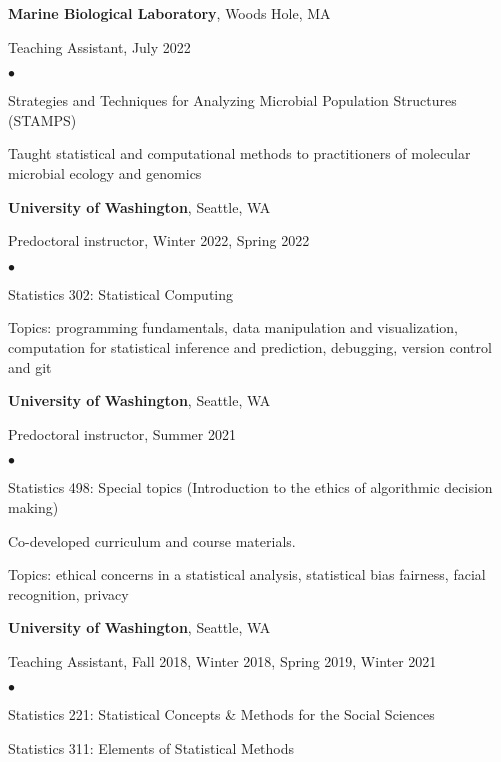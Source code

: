 \documentclass[margin,centered]{res}
\newenvironment{list1}{
  \begin{list}{\ding{113}}{%
      \setlength{\itemsep}{0in}
      \setlength{\parsep}{0in} \setlength{\parskip}{0in}
      \setlength{\topsep}{0in} \setlength{\partopsep}{0in}
      \setlength{\leftmargin}{0.17in}}}{\end{list}}
\newenvironment{list2}{
  \begin{list}{$\bullet$}{%
      \setlength{\itemsep}{0in}
      \setlength{\parsep}{0in} \setlength{\parskip}{0in}
      \setlength{\topsep}{0in} \setlength{\partopsep}{0in}
      \setlength{\leftmargin}{0.2in}}}{\end{list}}
\begin{document}
\begin{resume}
{\bf Marine Biological Laboratory}, Woods Hole, MA
\begin{list1}
\item[] Teaching Assistant, July 2022
\begin{list2}
\vspace*{.05in}
\item Strategies and Techniques for Analyzing Microbial Population Structures (STAMPS)
\item Taught statistical and computational methods to practitioners of molecular microbial ecology and genomics
\end{list2}
\end{list1}

{\bf University of Washington}, Seattle, WA
\begin{list1}
\item[] Predoctoral instructor, Winter 2022, Spring 2022
\begin{list2}
\vspace*{.05in}
\item Statistics 302: Statistical Computing
\item Topics: programming fundamentals, data manipulation and visualization, computation for statistical inference and prediction, debugging, version control and git
\end{list2}
\end{list1}

{\bf University of Washington}, Seattle, WA
\begin{list1}
\item[] Predoctoral instructor, Summer 2021
\begin{list2}
\vspace*{.05in}
\item Statistics 498: Special topics (Introduction to the ethics of algorithmic decision making)
\item Co-developed curriculum and course materials. 
\item Topics: ethical concerns in a statistical analysis, statistical bias fairness, facial recognition, privacy
\end{list2}
\end{list1}

{\bf University of Washington}, Seattle, WA
\begin{list1}
\item[] Teaching Assistant, Fall 2018, Winter 2018, Spring 2019, Winter 2021
\begin{list2}
\vspace*{.05in}
\item Statistics 221: Statistical Concepts \& Methods for the Social Sciences
\item Statistics 311: Elements of Statistical Methods
\end{list2}
\end{list1}


\end{resume}
\end{document}
